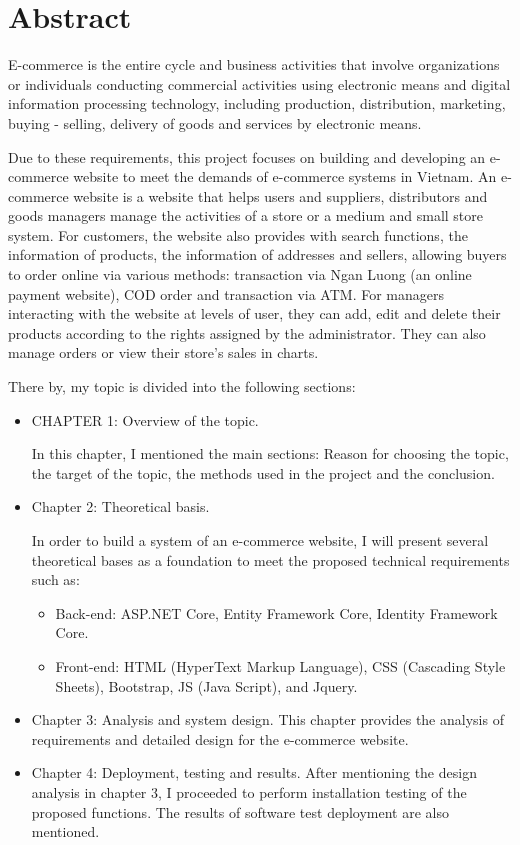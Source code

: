 \thispagestyle{plain}
\chapter*{Abstract}
E-commerce is the entire cycle and business activities that involve organizations or individuals conducting commercial activities using electronic means and digital information processing technology, including production, distribution, marketing, buying - selling, delivery of goods and services by electronic means.
\par
Due to these requirements, this project focuses on building and developing an e-commerce website to meet the demands of e-commerce systems in Vietnam. An e-commerce website is a website that helps users and suppliers, distributors and goods managers manage the activities of a store or a medium and small store system. For customers, the website also provides with search functions, the information of products, the information of addresses and sellers, allowing buyers to order online via various methods: transaction via Ngan Luong (an online payment website), COD order and transaction via ATM. For managers interacting with the website at levels of user, they can add, edit and delete their products according to the rights assigned by the administrator. They can also manage orders or view their store's sales in charts.
\par
There by, my topic is divided into the following sections:
\begin{itemize}
\item   CHAPTER 1: Overview of the topic.\par
In this chapter, I mentioned the main sections: Reason for choosing the topic, the target of the topic, the methods used in the project and the conclusion.
\item   Chapter 2: Theoretical basis.\par
In order to build a system of an e-commerce website, I will present several theoretical bases as a foundation to meet the proposed technical requirements such as:
\begin{itemize}
\item  Back-end: ASP.NET Core, Entity Framework Core, Identity Framework Core.
\item  Front-end: HTML (HyperText Markup Language), CSS (Cascading Style Sheets), Bootstrap, JS (Java Script), and Jquery.
\end{itemize}
\item	Chapter 3: Analysis and system design.
This chapter provides the analysis of requirements and detailed design for the e-commerce website.
\item	Chapter 4: Deployment, testing and results.
After mentioning the design analysis in chapter 3, I proceeded to perform installation testing of the proposed functions. The results of software test deployment are also mentioned.
\end{itemize}

